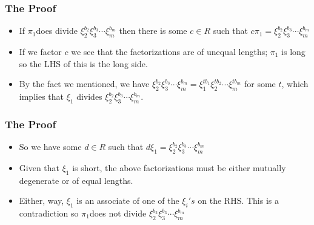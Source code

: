 \begin{frame}
  \frametitle{The Proof}
  \begin{itemize}
    \item If $\pi_{1}$does divide $\xi_{2}^{b_{2}}\xi_{3}^{b_{3}}\cdots\xi_{m}^{b_{m}}$ then there is some $c\in R$ such that $c\pi_{1}=\xi_{2}^{b_{2}}\xi_{3}^{b_{3}}\cdots\xi_{m}^{b_{m}}$
  \end{itemize}

  \pause{}
  \begin{itemize}
    \item If we factor $c$ we see that the factorizations are of unequal lengths; $\pi_{1}$ is long so the LHS of this is the long side.
  \end{itemize}

  \pause{}
  \begin{itemize}
    \item By the fact we mentioned, we have $\xi_{2}^{b_{2}}\xi_{3}^{b_{3}}\cdots\xi_{m}^{b_{m}}=\xi_{1}^{tb_{1}}\xi_{2}^{tb_{2}}\cdots\xi_{m}^{tb_{m}}$ for some $t$, which implies that $\xi_{1}$ divides $\xi_{2}^{b_{2}}\xi_{3}^{b_{3}}\cdots\xi_{m}^{b_{m}}$.
  \end{itemize}
\end{frame}

\begin{frame}
  \frametitle{The Proof}
  \begin{itemize}
    \item So we have some $d\in R$ such that $d\xi_{1}=\xi_{2}^{b_{2}}\xi_{3}^{b_{3}}\cdots\xi_{m}^{b_{m}}$
  \end{itemize}

  \pause{}
  \begin{itemize}
    \item Given that $\xi_{1}$ is short, the above factorizations must be either mutually degenerate or of equal lengths.
  \end{itemize}

  \pause{}
  \begin{itemize}
    \item Either, way, $\xi_{1}$ is an associate of one of the $\xi_{i}'s$ on the RHS. This is a contradiction so $\pi_{1}$does not divide $\xi_{2}^{b_{2}}\xi_{3}^{b_{3}}\cdots\xi_{m}^{b_{m}}$
  \end{itemize}
\end{frame}

